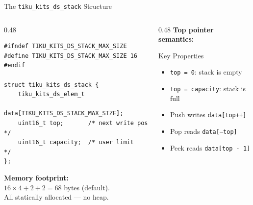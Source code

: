\documentclass[aspectratio=169, 10pt]{beamer}
\begin{document}
\begin{frame}[fragile]{The \texttt{tiku\_kits\_ds\_stack} Structure}
\begin{columns}[T]
\begin{column}{0.48\textwidth}
\begin{lstlisting}[style=cstyle,
  title={ds/stack/tiku\_kits\_ds\_stack.h}]
#ifndef TIKU_KITS_DS_STACK_MAX_SIZE
#define TIKU_KITS_DS_STACK_MAX_SIZE 16
#endif

struct tiku_kits_ds_stack {
    tiku_kits_ds_elem_t
        data[TIKU_KITS_DS_STACK_MAX_SIZE];
    uint16_t top;       /* next write pos */
    uint16_t capacity;  /* user limit     */
};
\end{lstlisting}

\vspace{0.3em}
\textbf{Memory footprint:}\\
$16 \times 4 + 2 + 2 = 68$ bytes (default).\\
All statically allocated --- no heap.
\end{column}

\begin{column}{0.48\textwidth}
\textbf{Top pointer semantics:}
\begin{center}
\end{center}

\vspace{0.5em}
\begin{block}{Key Properties}
\begin{itemize}
  \item \texttt{top = 0}: stack is empty
  \item \texttt{top = capacity}: stack is full
  \item Push writes \texttt{data[top++]}
  \item Pop reads \texttt{data[--top]}
  \item Peek reads \texttt{data[top - 1]}
\end{itemize}
\end{block}
\end{column}
\end{columns}
\end{frame}
\end{document}
